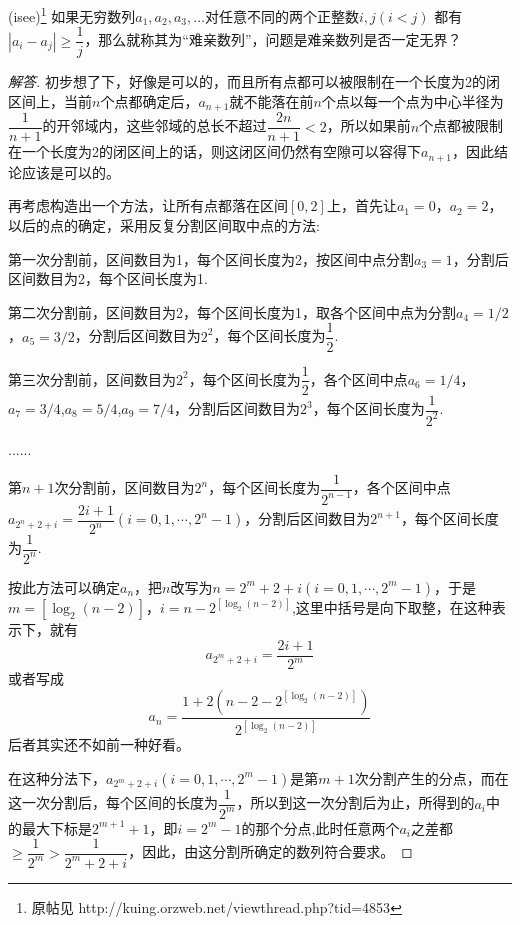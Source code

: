 \begin{exercise}
  (isee)\footnote{原帖见 http://kuing.orzweb.net/viewthread.php?tid=4853}
  如果无穷数列$a_1,a_2,a_3,\ldots $对任意不同的两个正整数$i,j(i<j)$ 都有$|a_i-a_j| \geqslant \dfrac{1}{j}$，那么就称其为“难亲数列”，问题是难亲数列是否一定无界？
\end{exercise}

\exerciseFrom[\url{http://kuing.orzweb.net/viewthread.php?tid=4853}]

\exerciseSolvedDate[2017-09-07]

\begin{proof}[解答]
  初步想了下，好像是可以的，而且所有点都可以被限制在一个长度为2的闭区间上，当前$n$个点都确定后，$a_{n+1}$就不能落在前$n$个点以每一个点为中心半径为$\dfrac{1}{n+1}$的开邻域内，这些邻域的总长不超过$\dfrac{2n}{n+1}<2$，所以如果前$n$个点都被限制在一个长度为2的闭区间上的话，则这闭区间仍然有空隙可以容得下$a_{n+1}$，因此结论应该是可以的。

  再考虑构造出一个方法，让所有点都落在区间$[0,2]$上，首先让$a_1=0$，$a_2=2$，以后的点的确定，采用反复分割区间取中点的方法:

第一次分割前，区间数目为1，每个区间长度为2，按区间中点分割$a_3=1$，分割后区间数目为2，每个区间长度为1.

第二次分割前，区间数目为2，每个区间长度为1，取各个区间中点为分割$a_4=1/2$，$a_5=3/2$，分割后区间数目为$2^2$，每个区间长度为$\dfrac{1}{2}$.

第三次分割前，区间数目为$2^2$，每个区间长度为$\dfrac{1}{2}$，各个区间中点$a_6=1/4$，$a_7=3/4$,$a_8=5/4$,$a_9=7/4$，分割后区间数目为$2^3$，每个区间长度为$\dfrac{1}{2^2}$.

......

第$n+1$次分割前，区间数目为$2^n$，每个区间长度为$\dfrac{1}{2^{n-1}}$，各个区间中点$a_{2^n+2+i}=\dfrac{2i+1}{2^n}(i=0,1,\cdots,2^n-1)$，分割后区间数目为$2^{n+1}$，每个区间长度为$\dfrac{1}{2^n}$.

按此方法可以确定$a_n$，把$n$改写为$n=2^m+2+i(i=0,1,\cdots,2^m-1)$，于是$m=[\log_2(n-2)]$，$i=n-2^{[\log_2(n-2)]}$,这里中括号是向下取整，在这种表示下，就有
\[ a_{2^m+2+i}=\frac{2i+1}{2^m} \]
或者写成
\[ a_n=\frac{1+2(n-2-2^{[\log_2(n-2)]})}{2^{[\log_2(n-2)]}} \]
后者其实还不如前一种好看。

在这种分法下，$a_{2^m+2+i}(i=0,1,\cdots,2^m-1)$是第$m+1$次分割产生的分点，而在这一次分割后，每个区间的长度为$\dfrac{1}{2^m}$，所以到这一次分割后为止，所得到的$a_i$中的最大下标是$2^{m+1}+1$，即$i=2^m-1$的那个分点,此时任意两个$a_i$之差都$\geqslant \dfrac{1}{2^m}>\dfrac{1}{2^m+2+i}$，因此，由这分割所确定的数列符合要求。
\end{proof}

